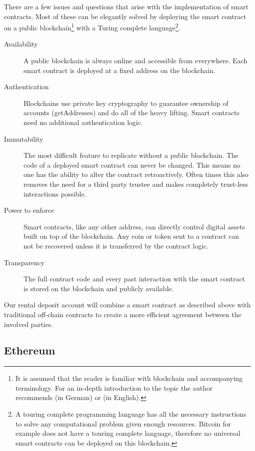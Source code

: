 \documentclass[12pt,a4paper,titlepage,oneside,english]{article}
\begin{document}
There are a few issues and questions that arise with the implementation of smart contracts. Most of these can be elegantly solved by deploying the smart contract on a public blockchain\footnote{It is assumed that the reader is familiar with blockchain and accompanying terminology. For an in-depth introduction to the topic the author recommends \cite{Schaer2017} (in German) or \cite{Lewis2018} (in English).} with a Turing complete language\footnote{A touring complete programming language has all the necessary instructions to solve any computational problem given enough resources. Bitcoin for example does not have a touring complete language, therefore no universal smart contracts can be deployed on this blockchain.}.


\begin{description}
	\item[Availability] A public blockchain is always online and accessible from everywhere. Each smart contract is deployed at a fixed address on the blockchain.
	\item[Authentication] Blockchains use private key cryptography to guarantee ownership of accounts (getAddresses) and do all of the heavy lifting. Smart contracts need no additional authentication logic.
	\item[Immutability] The most difficult feature to replicate without a public blockchain. The code of a deployed smart contract can never be changed. This means no one has the ability to alter the contract retroactively. Often times this also removes the need for a third party trustee and makes completely trust-less interactions possible.
	\item[Power to enforce] Smart contracts, like any other address, can directly control digital assets built on top of the blockchain. Any coin or token sent to a contract can not be recovered  unless it is transferred by the contract logic.
	\item[Transparency] The full contract code and every past interaction with the smart contract is stored on the blockchain and publicly available.
\end{description}

Our rental deposit account will combine a smart contract as described above with traditional off-chain contracts to create a more efficient agreement between the involved parties.

\subsection{Ethereum}
\label{sub:ethereum}
\end{document}
